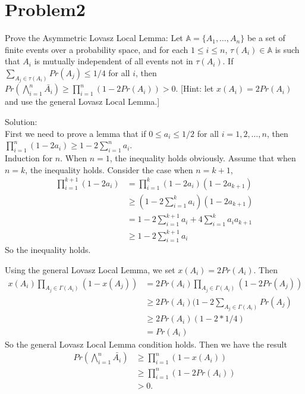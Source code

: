 \documentclass[12pt]{article}
\begin{document}
\section{Problem2}
Prove the Asymmetric Lovasz Local Lemma: Let $\mathbb{A} = \{A_1, \dots, A_n\}$ be a set of finite events over a probability space, and for each $1 \le i \le n$, $\tau(A_i) \in \mathbb{A}$ is such that $A_i$ is mutually independent of all events not in $\tau(A_i)$. If $\sum_{A_j \in \tau(A_i)} Pr(A_j) \le 1/4 $ for all $i$, then $ Pr(\bigwedge_{i=1}^n \bar{A_i}) \ge \prod_{i=1}^n (1 - 2Pr(A_i))> 0$. [Hint: let $x(A_i) = 2Pr(A_i)$ and use the general Lovasz Local Lemma.]

Solution:\\

First we need to prove a lemma that if $0\le a_i \le 1/2$ for all $i=1,2,\dots,n$, then $\prod_{i=1}^n (1-2a_i) \ge 1-2\sum_{i=1}^n a_i$.\\
Induction for $n$. When $n=1$, the inequality holds obviously. Assume that when $n=k$, the inequality holds. Consider the case when $n=k+1$,
\begin{equation}
    \begin{split}
    \prod_{i=1}^{k+1}(1-2a_i) &= \prod_{i=1}^k (1-2a_i) (1-2a_{k+1}) \\
    &\ge (1-2\sum_{i=1}^k a_i)(1-2a_{k+1})\\
    &= 1-2\sum_{i=1}^{k+1} a_i + 4\sum_{i=1}^k a_i a_{k+1}\\
    &\ge 1-2\sum_{i=1}^{k+1} a_i
    \end{split}
\end{equation}
So the inequality holds.

Using the general Lovasz Local Lemma, we set $x(A_i) = 2Pr(A_i)$. Then
\begin{equation}
    \begin{split}
    x(A_i)\prod_{A_j\in \Gamma(A_i)}(1-x(A_j)) &= 2Pr(A_i)\prod_{A_j\in \Gamma(A_i)}(1-2Pr(A_j))\\
    &\ge 2Pr(A_i) (1-2\sum_{A_j\in \Gamma(A_i)}Pr(A_j)\\
    &\ge 2Pr(A_i) (1 - 2 * 1/4)\\
    &= Pr(A_i)
    \end{split}
\end{equation}
So the general Lovasz Local Lemma condition holds. Then we have the result
\begin{equation}
    \begin{split}
    Pr(\bigwedge_{i=1}^n \bar{A_i}) &\ge \prod_{i=1}^n (1 - x(A_i))\\
    &\ge \prod_{i=1}^n (1 - 2Pr(A_i))\\
    &> 0.
    \end{split}
\end{equation}
\end{document}
